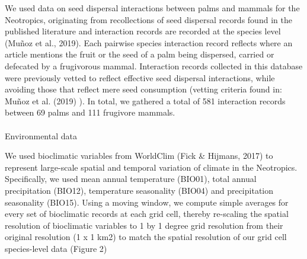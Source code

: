 \documentclass[
]{agujournal2019}
\makeatletter
\let\oldparagraph\paragraph
\renewcommand{\paragraph}{
    \@ifstar
      \xxxParagraphStar
      \xxxParagraphNoStar
  }
\newcommand{\xxxParagraphStar}[1]{\oldparagraph*{#1}\mbox{}}
\newcommand{\xxxParagraphNoStar}[1]{\oldparagraph{#1}\mbox{}}
\makeatother
\begin{document}
We used data on seed dispersal interactions between palms and mammals
for the Neotropics, originating from recollections of seed dispersal
records found in the published literature and interaction records are
recorded at the species level (Muñoz et al., 2019). Each pairwise
species interaction record reflects where an article mentions the fruit
or the seed of a palm being dispersed, carried or defecated by a
frugivorous mammal. Interaction records collected in this database were
previously vetted to reflect effective seed dispersal interactions,
while avoiding those that reflect mere seed consumption (vetting
criteria found in: Muñoz et al. (2019) ). In total, we gathered a total
of 581 interaction records between 69 palms and 111 frugivore mammals.

\paragraph{Environmental data}\label{environmental-data}

We used bioclimatic variables from WorldClim (Fick \& Hijmans, 2017) to
represent large-scale spatial and temporal variation of climate in the
Neotropics. Specifically, we used mean annual temperature (BIO01), total
annual precipitation (BIO12), temperature seasonality (BIO04) and
precipitation seasonality (BIO15). Using a moving window, we compute
simple averages for every set of bioclimatic records at each grid cell,
thereby re-scaling the spatial resolution of bioclimatic variables to 1
by 1 degree grid resolution from their original resolution (1 x 1 km2)
to match the spatial resolution of our grid cell species-level data
(Figure 2)
\end{document}
